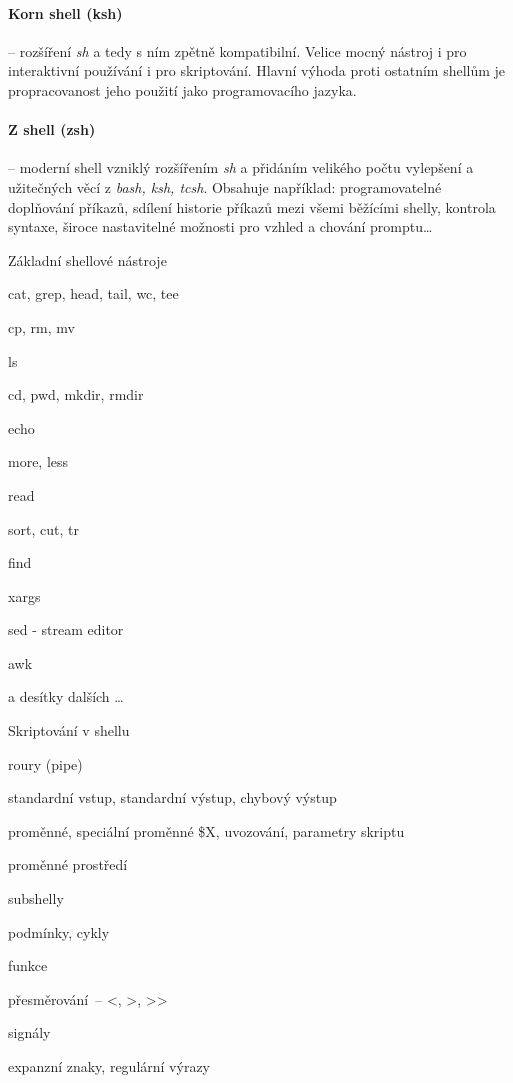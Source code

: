 \paragraph{Korn shell (ksh)} -- rozšíření \emph{sh} a tedy s ním zpětně
kompatibilní. Velice mocný nástroj i pro interaktivní používání i pro
skriptování. Hlavní výhoda proti ostatním shellům je propracovanost jeho použití
jako programovacího jazyka.

\paragraph{Z shell (zsh)} -- moderní shell vzniklý rozšířením \emph{sh} a
přidáním velikého počtu vylepšení a užitečných věcí z \emph{bash, ksh, tcsh}.
Obsahuje například: programovatelné doplňování příkazů, sdílení historie příkazů
mezi všemi běžícími shelly, kontrola syntaxe, široce nastavitelné možnosti pro
vzhled a chování promptu\dots

\begin{obecne}{Základní shellové nástroje}
  \begin{pitemize}
    \item  cat, grep, head, tail, wc, tee
    \item cp, rm, mv
    \item ls
    \item cd, pwd, mkdir, rmdir
    \item echo
    \item more, less
    \item read
    \item sort, cut, tr
    \item find
    \item xargs
    \item sed - stream editor
    \item awk
    \item a desítky dalších \dots
  \end{pitemize}
\end{obecne}

\begin{obecne}{Skriptování v shellu}
  \begin{pitemize}
    \item  roury (pipe)
    \item standardní vstup, standardní výstup, chybový výstup
    \item proměnné, speciální proměnné \$X, uvozování, parametry skriptu
    \item proměnné prostředí
    \item subshelly
    \item podmínky, cykly
    \item funkce
    \item přesměrování~-- <, >, >>
    \item signály
    \item expanzní znaky, regulární výrazy 
  \end{pitemize}
\end{obecne}

